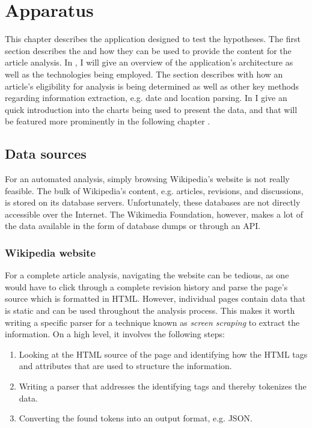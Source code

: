\chapter{Apparatus}\label{ch:apparatus}

This chapter describes the application designed to test the hypotheses.
The first section describes the  and how they can be used to provide the content for the article analysis.
In , I will give an overview of the application's architecture as well as the technologies being employed.
The section  describes with how an article's eligibility for analysis is being determined as well as other key methods regarding information extraction, e.g. date and location parsing. 
In  I give an quick introduction into the charts being used to present the data, and that will be featured more prominently in the following chapter . 


\section{Data sources}\label{sec:datasources}

For an automated analysis, simply browsing Wikipedia's website is not really feasible. 
The bulk of Wikipedia's content, e.g. articles, revisions, and discussions, is stored on its database servers.
Unfortunately, these databases are not directly accessible over the Internet.
The Wikimedia Foundation, however, makes a lot of the data available in the form of database dumps or through an \ac{API}.

\subsection{Wikipedia website}\label{sub:wpwebsite}

For a complete article analysis, navigating the website can be tedious, as one would have to click through a complete revision history and parse the page's source which is formatted in \ac{HTML}.
However, individual pages contain data that is static and can be used throughout the analysis process.
This makes it worth writing a specific parser for a technique known as \emph{screen scraping} to extract the information.
On a high level, it involves the following steps:

\begin{enumerate}
  \item Looking at the \ac{HTML} source of the page and identifying how the \ac{HTML} tags and attributes that are used to structure the information.
  \item Writing a parser that addresses the identifying tags and thereby tokenizes the data.
  \item Converting the found tokens into an output format, e.g. \ac{JSON}.
\end{enumerate}

